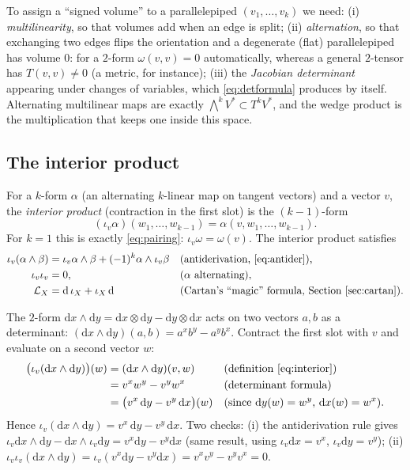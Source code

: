 \documentclass[11pt,a4paper]{article}
\numberwithin{equation}{section}
\theoremstyle{definition}
\theoremstyle{plain}
\newcommand{\dd}{\mathrm{d}}
\newcommand{\Lie}{\mathcal{L}}
\begin{document}
\begin{keyidea}
To assign a ``signed volume'' to a parallelepiped $(v_1,\dots,v_k)$ we need: (i) \emph{multilinearity}, so that volumes add when an edge is split;
(ii) \emph{alternation}, so that exchanging two edges flips the orientation and a degenerate (flat) parallelepiped has volume $0$: for a $2$-form $\omega(v,v)=0$ automatically, whereas a general $2$-tensor has $T(v,v)\neq0$ (a metric, for instance);
(iii) the \emph{Jacobian determinant} appearing under changes of variables, which \eqref{eq:detformula} produces by itself. Alternating multilinear maps are exactly $\bigwedge^kV^*\subset T^kV^*$, and the wedge product is the multiplication that keeps one inside this space.
\end{keyidea}

\subsection{The interior product}\label{sec:interior}

For a $k$-form $\alpha$ (an alternating $k$-linear map on tangent vectors) and a vector $v$, the \emph{interior product} (contraction in the first slot) is the $(k-1)$-form
\begin{equation}\label{eq:interior}
(\iota_v\alpha)(w_1,\dots,w_{k-1})=\alpha(v,w_1,\dots,w_{k-1}).
\end{equation}
For $k=1$ this is exactly \eqref{eq:pairing}: $\iota_v\omega=\omega(v)$. The interior product satisfies
\begin{align*}
\iota_v(\alpha\wedge\beta)&=\iota_v\alpha\wedge\beta+(-1)^k\alpha\wedge\iota_v\beta &&\text{(antiderivation, \eqref{eq:antider}),}\\
\iota_v\iota_v&=0, &&\text{($\alpha$ alternating),}\\
\Lie_X&=\dd\,\iota_X+\iota_X\,\dd &&\text{(Cartan's ``magic'' formula, Section~\ref{sec:cartan}).}
\end{align*}

\begin{example}\label{ex:interiorplane}
The $2$-form $\dd x\wedge\dd y=\dd x\otimes\dd y-\dd y\otimes\dd x$ acts on two vectors $a,b$ as a determinant:
$(\dd x\wedge\dd y)(a,b)=a^xb^y-a^yb^x$. Contract the first slot with $v$ and evaluate on a second vector $w$:
\begin{align*}
\bigl(\iota_v(\dd x\wedge\dd y)\bigr)(w)&=(\dd x\wedge\dd y)(v,w) &&\text{(definition \eqref{eq:interior})}\\
&=v^xw^y-v^yw^x &&\text{(determinant formula)}\\
&=\bigl(v^x\,\dd y-v^y\,\dd x\bigr)(w) &&\text{(since $\dd y(w)=w^y$, $\dd x(w)=w^x$).}
\end{align*}
Hence $\iota_v(\dd x\wedge\dd y)=v^x\,\dd y-v^y\,\dd x$. Two checks: (i) the antiderivation rule gives $\iota_v\dd x\wedge\dd y-\dd x\wedge\iota_v\dd y=v^x\dd y-v^y\dd x$ (same result, using $\iota_v\dd x=v^x$, $\iota_v\dd y=v^y$);
(ii) $\iota_v\iota_v(\dd x\wedge\dd y)=\iota_v(v^x\dd y-v^y\dd x)=v^xv^y-v^yv^x=0$.
\end{example}
\end{document}
